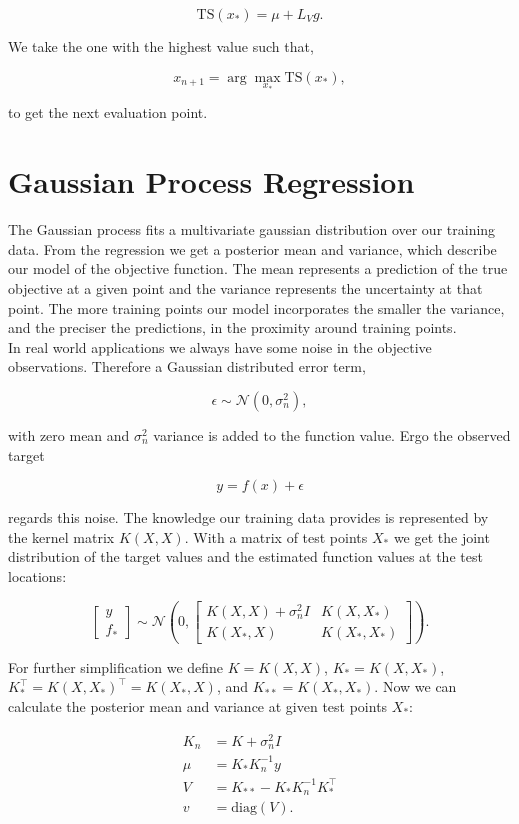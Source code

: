 $$\mathrm{TS}(x_*) = \mu + L_V g.$$

We take the one with the highest value such that,

$$x_{n+1} = \arg \max_{x_*} \mathrm{TS}(x_*),$$

to get the next evaluation point.

\section{Gaussian Process Regression}
The Gaussian process fits a multivariate gaussian distribution over our training data. From the regression we get a posterior mean and variance, which describe our model of the objective function. The mean represents a prediction of the true objective at a given point and the variance represents the uncertainty at that point. The more training points our model incorporates the smaller the variance, and the preciser the predictions, in the proximity around training points.\\
In real world applications we always have some noise in the objective observations. Therefore a Gaussian distributed error term,

$$\epsilon \sim \mathcal{N}(0,\sigma_n^2),$$

with zero mean and $\sigma_n^2$ variance is added to the function value. Ergo the observed target

$$y = f(x) + \epsilon$$

regards this noise. The knowledge our training data provides is represented by the kernel matrix $K(X,X)$. With a matrix of test points $X_*$ we get the joint distribution of the target values and the estimated function values at the test locations:

$$\left[ \begin{array}{c} y \\ f_* \end{array} \right] \sim \mathcal{N} \left(0, \begin{bmatrix} K(X,X)+\sigma_n^2 I & K(X,X_*) \\ K(X_*,X) & K(X_*,X_*) \end{bmatrix} \right).$$

For further simplification we define $K = K(X,X)$, $K_* = K(X,X_*)$, $K_*^{\top} = K(X,X_*)^{\top} = K(X_*,X)$, and $K_{**} = K(X_*,X_*)$. Now we can calculate the posterior mean and variance at given test points $X_*$:

\begin{align}
    K_n &= K+\sigma_n^2 I \label{eq:kNoise} \\
    \mu &= K_*K_n^{-1}y \label{eq:meanGauss} \\
    V &= K_{**}-K_*K_n^{-1}K_*^\top \label{eq:wholeVar} \\
    v &= \mathrm{diag}(V). \label{eq:vectorVar} \\ \nonumber
\end{align}

